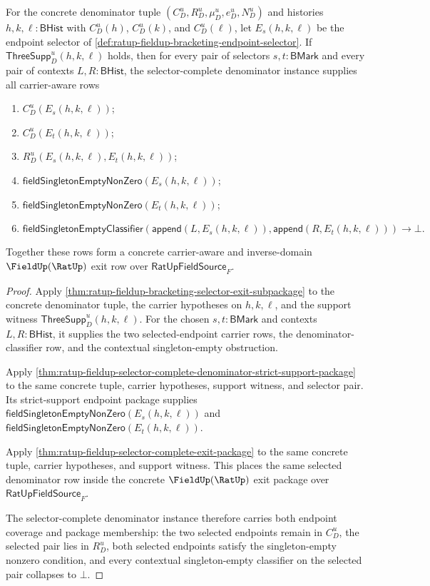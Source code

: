 \begin{theorem}
\label{thm:ratup-fieldup-carrier-aware-selector-complete-concrete-instance}
For the concrete denominator tuple $(C_D^u,R_D^u,\mu_D^u,e_D^u,N_D^u)$ and
histories $h,k,\ell:\mathsf{BHist}$ with $C_D^u(h)$, $C_D^u(k)$, and
$C_D^u(\ell)$, let $E_s(h,k,\ell)$ be the endpoint selector of
\autoref{def:ratup-fieldup-bracketing-endpoint-selector}. If
$\mathsf{ThreeSupp}_D^u(h,k,\ell)$ holds, then for every pair of selectors
$s,t:\mathsf{BMark}$ and every pair of contexts $L,R:\mathsf{BHist}$, the
selector-complete denominator instance supplies all carrier-aware rows
\begin{enumerate}
  \item $C_D^u(E_s(h,k,\ell))$;
  \item $C_D^u(E_t(h,k,\ell))$;
  \item $R_D^u(E_s(h,k,\ell),E_t(h,k,\ell))$;
  \item $\mathsf{fieldSingletonEmptyNonZero}(E_s(h,k,\ell))$;
  \item $\mathsf{fieldSingletonEmptyNonZero}(E_t(h,k,\ell))$;
  \item
  $$
  \mathsf{fieldSingletonEmptyClassifier}
  (\mathsf{append}(L,E_s(h,k,\ell)),\mathsf{append}(R,E_t(h,k,\ell)))\to\bot.
  $$
\end{enumerate}
Together these rows form a concrete carrier-aware and inverse-domain
$\FieldUp(\RatUp)$ exit row over $\mathsf{RatUpFieldSource}_F$.
\end{theorem}
\begin{proof}
Apply \autoref{thm:ratup-fieldup-bracketing-selector-exit-subpackage} to the
concrete denominator tuple, the carrier hypotheses on $h,k,\ell$, and the
support witness $\mathsf{ThreeSupp}_D^u(h,k,\ell)$. For the chosen
$s,t:\mathsf{BMark}$ and contexts $L,R:\mathsf{BHist}$, it supplies the two
selected-endpoint carrier rows, the denominator-classifier row, and the
contextual singleton-empty obstruction.

Apply
\autoref{thm:ratup-fieldup-selector-complete-denominator-strict-support-package}
to the same concrete tuple, carrier hypotheses, support witness, and selector
pair. Its strict-support endpoint package supplies
$\mathsf{fieldSingletonEmptyNonZero}(E_s(h,k,\ell))$ and
$\mathsf{fieldSingletonEmptyNonZero}(E_t(h,k,\ell))$.

Apply \autoref{thm:ratup-fieldup-selector-complete-exit-package} to the same
concrete tuple, carrier hypotheses, and support witness. This places the same
selected denominator row inside the concrete $\FieldUp(\RatUp)$ exit package
over $\mathsf{RatUpFieldSource}_F$.

The selector-complete denominator instance therefore carries both endpoint
coverage and package membership: the two selected endpoints remain in $C_D^u$,
the selected pair lies in $R_D^u$, both selected endpoints satisfy the
singleton-empty nonzero condition, and every contextual singleton-empty
classifier on the selected pair collapses to $\bot$.
\end{proof}
